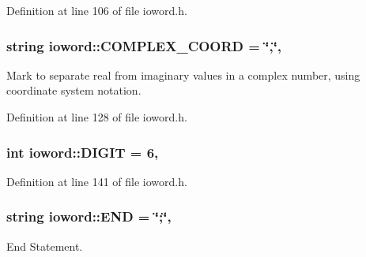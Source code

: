 Definition at line 106 of file ioword.\-h.

\hypertarget{classosea_1_1ofreq_1_1ioword_a010f0a47436472569b3135f3a0832383}{
\subsubsection[{C\-O\-M\-P\-L\-E\-X\-\_\-\-C\-O\-O\-R\-D}]{\setlength{\rightskip}{0pt plus 5cm}string ioword\-::\-C\-O\-M\-P\-L\-E\-X\-\_\-\-C\-O\-O\-R\-D = \char`\"{},\char`\"{}\hspace{0.3cm}{\ttfamily [static]}, {\ttfamily [protected]}}}\label{classosea_1_1ofreq_1_1ioword_a010f0a47436472569b3135f3a0832383}
Mark to separate real from imaginary values in a complex number, using coordinate system notation. 

Definition at line 128 of file ioword.\-h.

\hypertarget{classosea_1_1ofreq_1_1ioword_af02e800557869d72c2e10b56bd29a120}{
\subsubsection[{D\-I\-G\-I\-T}]{\setlength{\rightskip}{0pt plus 5cm}int ioword\-::\-D\-I\-G\-I\-T = 6\hspace{0.3cm}{\ttfamily [static]}, {\ttfamily [protected]}}}\label{classosea_1_1ofreq_1_1ioword_af02e800557869d72c2e10b56bd29a120}


Definition at line 141 of file ioword.\-h.

\hypertarget{classosea_1_1ofreq_1_1ioword_a41b127993e1339c4e8f365d875a0bd83}{
\subsubsection[{E\-N\-D}]{\setlength{\rightskip}{0pt plus 5cm}string ioword\-::\-E\-N\-D = \char`\"{};\char`\"{}\hspace{0.3cm}{\ttfamily [static]}, {\ttfamily [protected]}}}\label{classosea_1_1ofreq_1_1ioword_a41b127993e1339c4e8f365d875a0bd83}
End Statement. 

